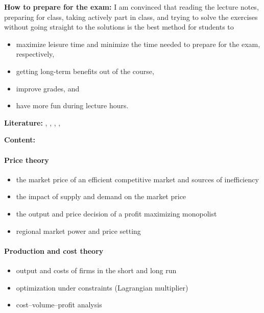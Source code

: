 \documentclass[
  12pt,
  oneside]{book}
\providecommand{\tightlist}{%
  \setlength{\itemsep}{0pt}\setlength{\parskip}{0pt}}
\theoremstyle{definition}
\theoremstyle{definition}
\theoremstyle{definition}
\theoremstyle{definition}
\theoremstyle{remark}
\begin{document}
\textbf{How to prepare for the exam:}
I am convinced that reading the lecture notes, preparing for class, taking actively part in class, and trying to solve the exercises without going straight to the solutions is the best method for students to

\begin{itemize}
\tightlist
\item
  maximize leisure time and minimize the time needed to prepare for the exam, respectively,
\item
  getting long-term benefits out of the course,
\item
  improve grades, and
\item
  have more fun during lecture hours.
\end{itemize}

\textbf{Literature:}
\citet{Bazerman2017Judgement}, \citet{Hoover2020Introduction}, \citet{Parkin2017Economics}, \citet{Wilkinson2022Managerial}, \citet{Bonanno2017Decision}

\textbf{Content:}

\hypertarget{price-theory}{%
\paragraph*{Price theory}\label{price-theory}}

\begin{itemize}
\tightlist
\item
  the market price of an efficient competitive market and sources of inefficiency
\item
  the impact of supply and demand on the market price
\item
  the output and price decision of a profit maximizing monopolist
\item
  regional market power and price setting
\end{itemize}

\hypertarget{production-and-cost-theory}{%
\paragraph*{Production and cost theory}\label{production-and-cost-theory}}

\begin{itemize}
\tightlist
\item
  output and costs of firms in the short and long run
\item
  optimization under constraints (Lagrangian multiplier)
\item
  cost--volume--profit analysis
\end{itemize}
\end{document}
